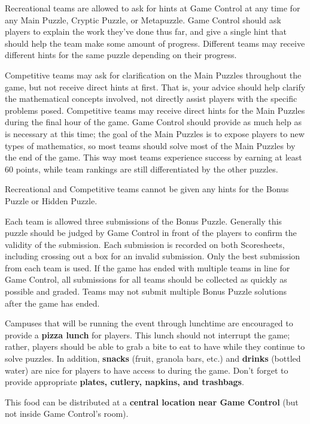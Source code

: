 Recreational teams are allowed to ask for hints at Game Control at any time
for any Main Puzzle, Cryptic Puzzle, or Metapuzzle. Game Control should ask
players to explain the work they've
done thus far, and give a single hint that should help the team make some
amount of progress. Different teams may receive different hints for the same
puzzle depending on their progress.

Competitive teams may ask for clarification on the Main Puzzles throughout
the game, but not receive direct hints at first. That is, your advice should
help clarify the mathematical concepts involved, not directly assist players
with the specific problems posed.
Competitive teams may receive direct hints for the Main Puzzles during the final
hour of the game. Game Control should provide as much help as is necessary
at this time;
the goal of the Main Puzzles is to expose players to new types of mathematics,
so most teams should solve most of the Main Puzzles by the end of the game.
This way most teams experience success by earning at least 60 points, while
team rankings are still differentiated by the other puzzles.

Recreational and Competitive teams cannot be given any hints for the Bonus
Puzzle or Hidden Puzzle.

Each team is allowed three submissions of the Bonus Puzzle. Generally this
puzzle should be judged by Game Control in front of the players to confirm
the validity of the submission. Each submission is recorded on both
Scoresheets, including crossing out a box for an invalid submission.
Only the best submission from each team is used. If the game has ended
with multiple teams in line for Game Control, all submissions for all teams
should be collected as quickly as possible and graded. Teams may not submit
multiple Bonus Puzzle solutions after the game has ended.


Campuses that will be running the event through lunchtime are encouraged to
provide a \textbf{pizza lunch} for players. This lunch should not interrupt the
game; rather, players should be able to grab a bite to eat to have while they
continue to solve puzzles. In addition, \textbf{snacks}
(fruit, granola bars, etc.) and \textbf{drinks} (bottled water) are nice for
players to have access to during the game. Don't forget to provide
appropriate \textbf{plates, cutlery, napkins, and trashbags}.

This food can be distributed at a \textbf{central location near Game Control}
(but not inside Game Control's room).

